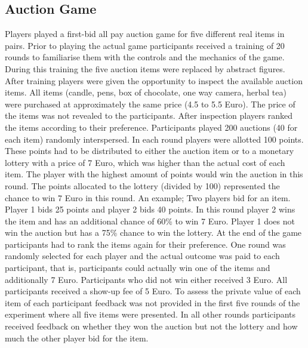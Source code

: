 \documentclass [man]{apa6}
\begin{document}
\subsection{Auction Game}
Players played a first-bid all pay auction game for five different real items in pairs. Prior to playing the actual game participants received a training of 20 rounds to familiarise them with the controls and the mechanics of the game. During this training the five auction items were replaced by abstract figures. After training players were given the opportunity to inspect the available auction items. All items (candle, pens, box of chocolate, one way camera, herbal tea) were purchased at approximately the same price (4.5 to 5.5 Euro). The price of the items was not revealed to the participants. After inspection players ranked the items according to their preference. Participants played 200 auctions (40 for each item) randomly interspersed. In each round players were allotted 100 points. These points had to be distributed to either the auction item or to a monetary lottery with a price of 7 Euro, which was higher than the actual cost of each item. The player with the highest amount of points would win the auction in this round. The points allocated to the lottery (divided by 100) represented the chance to win 7 Euro in this round. An example; Two players bid for an item. Player 1 bids 25 points and player 2 bids 40 points. In this round player 2 wins the item and has an additional chance of 60\% to win 7 Euro. Player 1 does not win the auction but has a 75\% chance to win the lottery. At the end of the game participants had to rank the items again for their preference. One round was randomly selected for each player and the actual outcome was paid to each participant, that is, participants could actually win one of the items and additionally 7 Euro. Participants who did not win either received 3 Euro. All participants received a show-up fee of 5 Euro. To assess the private value of each item of each participant feedback was not provided in the first five rounds of the experiment where all five items were presented. In all other rounds participants received feedback on whether they won the auction but not the lottery and how much the other player bid for the item. 
\end{document}
